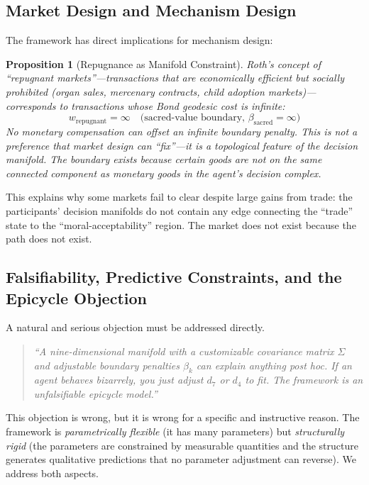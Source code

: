 \documentclass[12pt]{article}
\newtheorem{proposition}[theorem]{Proposition}
\theoremstyle{definition}
\theoremstyle{remark}
\begin{document}
\subsection{Market Design and Mechanism Design}

The framework has direct implications for mechanism design:

\begin{proposition}[Repugnance as Manifold Constraint]
\label{prop:repugnance}
Roth's \cite{roth2007} concept of ``repugnant markets''---transactions that are economically efficient but socially prohibited (organ sales, mercenary contracts, child adoption markets)---corresponds to transactions whose Bond geodesic cost is infinite:
\begin{equation}
w_{\text{repugnant}} = \infty \quad \text{(sacred-value boundary, } \beta_{\text{sacred}} = \infty\text{)}
\end{equation}
No monetary compensation can offset an infinite boundary penalty.  This is not a preference that market design can ``fix''---it is a topological feature of the decision manifold.  The boundary exists because certain goods are \emph{not on the same connected component} as monetary goods in the agent's decision complex.
\end{proposition}

This explains why some markets fail to clear despite large gains from trade: the participants' decision manifolds do not contain any edge connecting the ``trade'' state to the ``moral-acceptability'' region.  The market does not exist because the path does not exist.

\subsection{Falsifiability, Predictive Constraints, and the Epicycle Objection}
\label{sec:falsifiability}

A natural and serious objection must be addressed directly.

\begin{quote}
\emph{``A nine-dimensional manifold with a customizable covariance matrix $\Sigma$ and adjustable boundary penalties $\beta_k$ can explain anything post hoc.  If an agent behaves bizarrely, you just adjust $d_7$ or $d_4$ to fit.  The framework is an unfalsifiable epicycle model.''}
\end{quote}

This objection is wrong, but it is wrong for a specific and instructive reason.  The framework is \emph{parametrically flexible} (it has many parameters) but \emph{structurally rigid} (the parameters are constrained by measurable quantities and the structure generates qualitative predictions that no parameter adjustment can reverse).  We address both aspects.
\end{document}
